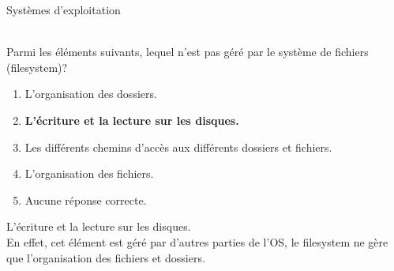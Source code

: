 \begin{section}{Systèmes d'exploitation}
\begin{comment}
        \begin{Exercice}[5 minutes]
        Quel(s) lien(s) fait le système d'exploitation? Plusieures réponses sont possibles
        \begin{enumerate}
            \item \textbf{Entre les applications et internet.}
            \item \textbf{Entre la souris et l'écran.}
            \item Le disque dur et le processeur
            \item Aucune réponse n'est correcte.
        \end{enumerate}
        \begin{solution}
            Le système d'exploitation fait des liens abstraits. Or le lien entre le disque dur et le processeur est un lien physique car ce sont tous les deux du hardware.
	    De plus, le système d'exploitation est résponsable des tous les périphériques ainsi que toutes les connexions. 
        \end{solution}
        \begin{conseil}
            Réfléchir à la nature de la connexion entre chaque objet de chaque proposition. 
	    Internet ici est considérer comme software et non son application physique. 
        \end{conseil}
    \end{Exercice}
\end{comment}

    
    
     \begin{Exercice}[5 minutes]\\
    Parmi les éléments suivants, lequel n'est pas géré par le système de fichiers (filesystem)?
        \begin{enumerate}
            \item L'organisation des dossiers.
            \item \textbf{L'écriture et la lecture sur les disques.}
            \item Les différents chemins d'accès aux différents dossiers et fichiers.
            \item L'organisation des fichiers.
            \item Aucune réponse correcte.
        \end{enumerate}
    \end{Exercice}
    
    \begin{solution}
        L'écriture et la lecture sur les disques. \\
	
	En effet, cet élément est géré par d'autres parties de l'OS, le filesystem ne gère que l'organisation des fichiers et dossiers. \\ 
    \end{solution}
    
\end{section}

